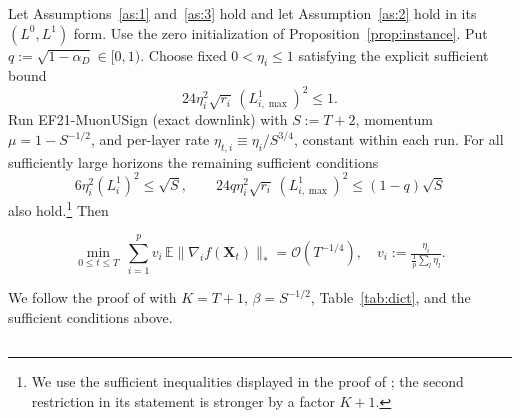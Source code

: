 \begin{corollary}\label{cor:l0l1}
\begin{codex}
Let Assumptions~\ref{as:1} and~\ref{as:3} hold and let Assumption~\ref{as:2} hold in its $(L^0,L^1)$ form. Use the zero initialization of Proposition~\ref{prop:instance}. Put $q:=\sqrt{1-\alpha_D}\in[0,1)$. Choose fixed $0<\eta_i\le1$ satisfying the explicit sufficient bound
\[
24\eta_i^2\sqrt{r_i}\,(L^1_{i,\max})^2\le1.
\]
Run EF21-MuonUSign (exact downlink) with $S:=T+2$, momentum $\mu=1-S^{-1/2}$, and per-layer rate $\eta_{t,i}\equiv\eta_i/S^{3/4}$, constant within each run. For all sufficiently large horizons the remaining sufficient conditions
\[
6\eta_i^2(L_i^1)^2\le\sqrt S,\qquad
24q\eta_i^2\sqrt{r_i}\,(L^1_{i,\max})^2\le(1-q)\sqrt S
\]
also hold.\footnote{We use the sufficient inequalities displayed in the proof of \citet[Thm.~24]{gruntkowska2025error}; the second restriction in its statement is stronger by a factor $K+1$.} Then
\end{codex}
\begin{equation*}
\min_{0\le t\le T}\ \textstyle\sum_{i=1}^p v_i\,\mathbb{E}\|\nabla_i f(\mathbf{X}_t)\|_* = \mathcal{O}(T^{-1/4}),\quad v_i := \tfrac{\eta_i}{\frac{1}{p}\sum_l\eta_l}.
\end{equation*}
\end{corollary}
\begin{codex}
\begin{paperproof}
We follow the proof of \citet[Thm.~24]{gruntkowska2025error} with $K=T+1$, $\beta=S^{-1/2}$, Table~\ref{tab:dict}, and the sufficient conditions above.
\end{paperproof}
\end{codex}





\subsection{}

